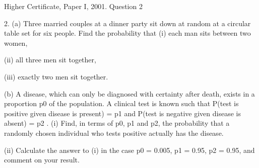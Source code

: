 \documentclass[a4paper,12pt]{article}
\begin{document}
Higher Certificate, Paper I, 2001. Question 2
\begin{framed}

2. (a) Three married couples at a dinner party sit down at random at a circular
table set for six people. Find the probability that
(i) each man sits between two women,

(ii) all three men sit together,

(iii) exactly two men sit together.

(b) A disease, which can only be diagnosed with certainty after death, exists in
a proportion p0 of the population. A clinical test is known such that
P(test is positive given disease is present) = p1
and
P(test is negative given disease is absent) = p2 .
(i) Find, in terms of p0, p1 and p2, the probability that a randomly
chosen individual who tests positive actually has the disease.

(ii) Calculate the answer to (i) in the case p0 = 0.005, p1 = 0.95,
p2 = 0.95, and comment on your result.
\end{framed}
\end{document}
